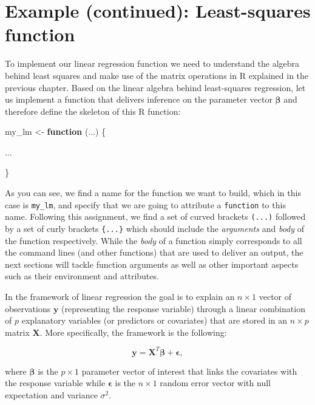 \documentclass[12pt,]{krantz}
\newenvironment{Shaded}{\begin{snugshade}}{\end{snugshade}}
\newcommand{\StringTok}[1]{\textcolor[rgb]{0.5,0.5,0.5}{#1}}
\newcommand{\ControlFlowTok}[1]{\textcolor[rgb]{0.27,0.27,0.27}{\textbf{#1}}}
\newcommand{\NormalTok}[1]{#1}
\begin{document}
\section{Example (continued): Least-squares
function}\label{example-continued-least-squares-function}

To implement our linear regression function we need to understand the
algebra behind least squares and make use of the matrix operations in R
explained in the previous chapter. Based on the linear algebra behind
least-squares regression, let us implement a function that delivers
inference on the parameter vector \(\boldsymbol{\beta}\) and therefore
define the skeleton of this R function:

\begin{Shaded}
\begin{Highlighting}[]
\NormalTok{my_lm <-}\StringTok{ }\ControlFlowTok{function}\NormalTok{ (...) \{}
  
\NormalTok{  ...}
  
\NormalTok{\}}
\end{Highlighting}
\end{Shaded}

As you can see, we find a name for the function we want to build, which
in this case is \texttt{my\_lm}, and specify that we are going to
attribute a \texttt{function} to this name. Following this assignment,
we find a set of curved brackets \texttt{(...)} followed by a set of
curly brackets \texttt{\{...\}} which should include the
\emph{arguments} and \emph{body} of the function respectively. While the
\emph{body} of a function simply corresponds to all the command lines
(and other functions) that are used to deliver an output, the next
sections will tackle function arguments as well as other important
aspects such as their environment and attributes.

In the framework of linear regression the goal is to explain an
\(n \times 1\) vector of observations \(\mathbf{y}\) (representing the
response variable) through a linear combination of \(p\) explanatory
variables (or predictors or covariates) that are stored in an
\(n \times p\) matrix \(\mathbf{X}\). More specifically, the framework
is the following:

\[
\mathbf{y} = \mathbf{X}^T\boldsymbol{\beta} + \mathbf{\epsilon},
\]

where \(\boldsymbol{\beta}\) is the \(p \times 1\) parameter vector of
interest that links the covariates with the response variable while
\(\mathbf{\epsilon}\) is the \(n \times 1\) random error vector with
null expectation and variance \(\sigma^2\).
\end{document}
